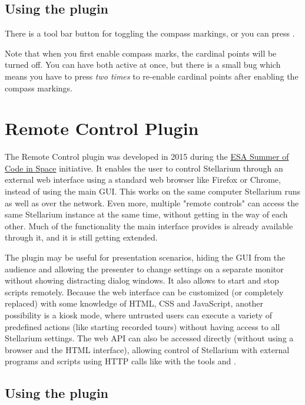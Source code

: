 \subsection{Using the plugin}
\label{sec:plugins:CompassMarks:using}

There is a tool bar button for toggling the compass markings, or you can
press .

Note that when you first enable compass marks, the cardinal points will
be turned off. You can have both active at once, but there is a small
bug which means you have to press  \emph{two times} to
re-enable cardinal points after enabling the compass markings.

\section{Remote Control Plugin}
\label{sec:plugins:RemoteControl}

The Remote Control plugin was developed in 2015 during the 
\href{http://sophia.estec.esa.int/socis/}{ESA Summer of Code in Space} 
initiative. It enables the user to control Stellarium through an external web 
interface using a standard web browser like Firefox or Chrome, instead of using 
the main GUI. This works on the same computer Stellarium runs as well as over 
the network. Even more, multiple "remote controls" can access the same 
Stellarium instance at the same time, without getting in the way of each other. 
Much of the functionality the main interface provides is already available 
through it, and it is still getting extended.

The plugin may be useful for presentation scenarios, hiding the GUI from the 
audience and allowing the presenter to change settings on a separate monitor 
without showing distracting dialog windows. It also allows to start and stop 
scripts remotely. Because the web interface can be customized (or completely 
replaced) with some knowledge of HTML, CSS and JavaScript, another possibility 
is a kiosk mode, where untrusted users can execute a variety of predefined 
actions (like starting recorded tours) without having access to all Stellarium 
settings. The web API can also be accessed directly (without using a browser 
and the HTML interface), allowing control of Stellarium with external programs 
and scripts using HTTP calls like with the tools  and .

\subsection{Using the plugin}
\label{sec:plugins:RemoteControl:using}

